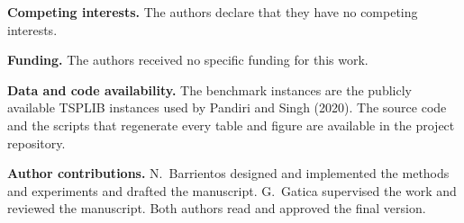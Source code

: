 \documentclass[sn-chicago]{sn-jnl}
\begin{document}
\noindent\textbf{Competing interests.} The authors declare that they have no
competing interests.

\noindent\textbf{Funding.} The authors received no specific funding for this work.

\noindent\textbf{Data and code availability.} The benchmark instances are the
publicly available TSPLIB instances used by Pandiri and Singh (2020). The source
code and the scripts that regenerate every table and figure are available in the
project repository.

\noindent\textbf{Author contributions.} N.\ Barrientos designed and implemented the
methods and experiments and drafted the manuscript. G.\ Gatica supervised the work
and reviewed the manuscript. Both authors read and approved the final version.


\end{document}
